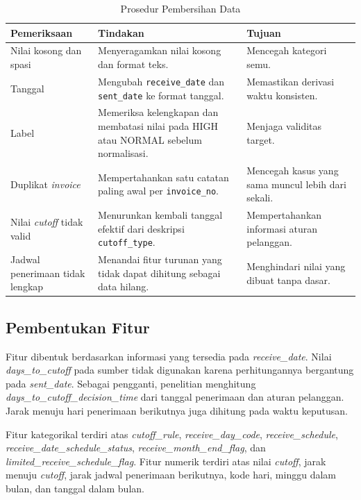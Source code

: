 \begin{table}[htbp]
    \centering
    \caption{Prosedur Pembersihan Data}
    \label{tab:prosedur-pembersihan-data}
    \small
    \renewcommand{\arraystretch}{1.2}
    \begin{tabularx}{\textwidth}{p{}p{}X}
        \toprule
        \textbf{Pemeriksaan} & \textbf{Tindakan} & \textbf{Tujuan} \\
        \midrule
        Nilai kosong dan spasi & Menyeragamkan nilai kosong dan format teks. & Mencegah kategori semu. \\
        Tanggal & Mengubah \texttt{receive\_date} dan \texttt{sent\_date} ke format tanggal. & Memastikan derivasi waktu konsisten. \\
        Label & Memeriksa kelengkapan dan membatasi nilai pada HIGH atau NORMAL sebelum normalisasi. & Menjaga validitas target. \\
        Duplikat \textit{invoice} & Mempertahankan satu catatan paling awal per \texttt{invoice\_no}. & Mencegah kasus yang sama muncul lebih dari sekali. \\
        Nilai \textit{cutoff} tidak valid & Menurunkan kembali tanggal efektif dari deskripsi \texttt{cutoff\_type}. & Mempertahankan informasi aturan pelanggan. \\
        Jadwal penerimaan tidak lengkap & Menandai fitur turunan yang tidak dapat dihitung sebagai data hilang. & Menghindari nilai yang dibuat tanpa dasar. \\
        \bottomrule
    \end{tabularx}
\end{table}

\subsection{Pembentukan Fitur}

Fitur dibentuk berdasarkan informasi yang tersedia pada \textit{receive\_date}. Nilai \textit{days\_to\_cutoff} pada sumber tidak digunakan karena perhitungannya bergantung pada \textit{sent\_date}. Sebagai pengganti, penelitian menghitung \textit{days\_to\_cutoff\_decision\_time} dari tanggal penerimaan dan aturan pelanggan. Jarak menuju hari penerimaan berikutnya juga dihitung pada waktu keputusan.

Fitur kategorikal terdiri atas \textit{cutoff\_rule}, \textit{receive\_day\_code}, \textit{receive\_schedule}, \textit{receive\_date\_schedule\_status}, \textit{receive\_month\_end\_flag}, dan \textit{limited\_receive\_schedule\_flag}. Fitur numerik terdiri atas nilai \textit{cutoff}, jarak menuju \textit{cutoff}, jarak jadwal penerimaan berikutnya, kode hari, minggu dalam bulan, dan tanggal dalam bulan.

